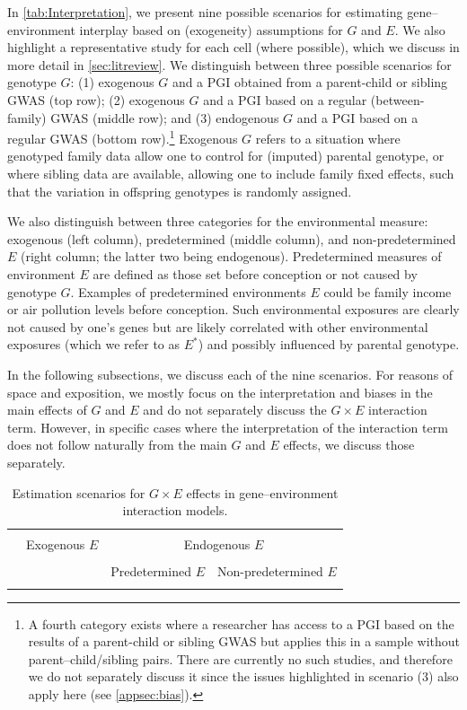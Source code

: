 \documentclass[12pt,a4paper]{article}
\begin{document}
\begin{bibunit}
In \autoref{tab:Interpretation}, we present nine possible scenarios for estimating gene--environment interplay based on (exogeneity) assumptions for $G$ and $E$. We also highlight a representative study for each cell (where possible), which we discuss in more detail in \autoref{sec:litreview}. We distinguish between three possible scenarios for genotype $G$: 
(1) exogenous $G$ and a PGI obtained from a parent-child or sibling GWAS (top row); (2) exogenous $G$ and a PGI based on a regular (between-family) GWAS (middle row); and (3) endogenous $G$ and a PGI based on a regular GWAS (bottom row).\footnote{A fourth category exists where a researcher has access to a PGI based on the results of a parent-child or sibling GWAS but applies this in a sample without parent--child/sibling pairs. There are currently no such studies, and therefore we do not separately discuss it since the issues highlighted in scenario (3) also apply here (see \autoref{appsec:bias}).} 
Exogenous $G$ refers to a situation where genotyped family data allow one to control for (imputed) parental genotype, or where sibling data are available, allowing one to include family fixed effects, such that the variation in offspring genotypes is randomly assigned.

We also distinguish between three categories for the environmental measure: exogenous (left column), predetermined (middle column), and non-predetermined $E$ (right column; the latter two being endogenous). 
Predetermined measures of environment $E$ are defined as those set before conception or not caused by genotype $G$. Examples of predetermined environments $E$ could be family income or air pollution levels before conception. 
Such environmental exposures are clearly not caused by one's genes but are likely correlated with other environmental exposures (which we refer to as $E^*$) and possibly influenced by parental genotype.

In the following subsections, we discuss each of the nine scenarios. For reasons of space and exposition, we mostly focus on the interpretation and biases in the main effects of $G$ and $E$ and do not separately discuss the $G \times E$ interaction term. However, in specific cases where the interpretation of the interaction term does not follow naturally from the main $G$ and $E$ effects, we discuss those separately.  

\begin{landscape}
\begin{table}[H] \caption{Estimation scenarios for $G \times E$ effects in gene--environment interaction models.} \label{tab:Interpretation}
\centering
{\scriptsize
\begin{tabular}{llll} \\
\hline \hline \\
& \multicolumn{1}{c}{Exogenous $E$} & \multicolumn{2}{c}{Endogenous $E$} \\ 
\cmidrule(lr){2-2}\cmidrule(lr){3-4} \\
& \multicolumn{1}{c}{} & \multicolumn{1}{c}{Predetermined $E$} & \multicolumn{1}{c}{Non-predetermined $E$} \\ 
\hline
& & & \\


\end{tabular}}
\end{table}
\end{landscape}
\end{bibunit}
\end{document}
